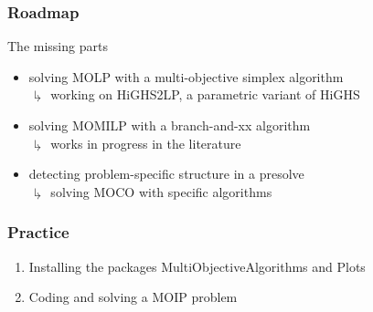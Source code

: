 \documentclass[]{beamer}
\begin{document}
\begin{frame}
  \frametitle{Roadmap}
\vspace{3mm}

The missing parts

\begin{itemize}
\item solving MOLP with a  multi-objective simplex algorithm\\
$\drsh$ working on HiGHS2LP, a parametric variant of HiGHS
\pause
\item solving MOMILP with a  branch-and-xx algorithm\\
$\drsh$ works in progress in the literature 
\pause
\item detecting problem-specific structure in a presolve\\
$\drsh$ solving MOCO with specific algorithms 
\end{itemize}


\end{frame}




% 
%

\begin{frame}
  \frametitle{Practice}
\vspace{3mm}

\begin{enumerate}
\item Installing the packages MultiObjectiveAlgorithms and Plots

\item Coding and solving a MOIP problem \vspace{3mm}

\end{enumerate}
\end{frame}


% 
%
\end{document}
